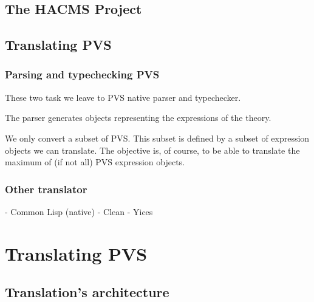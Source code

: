 \documentclass[12pt,a4paper]{article}
\begin{document}
\subsection{The HACMS Project}


\subsection{Translating PVS}
\subsubsection{Parsing and typechecking PVS}
These two task we leave to PVS native parser and typechecker.

The parser generates objects representing the expressions of the theory.

We only convert a subset of PVS.
This subset is defined by a subset of expression objects we can translate.
The objective is, of course, to be able to translate the maximum of (if not all) PVS expression objects.

\subsubsection{Other translator}
- Common Lisp (native)
- Clean
- Yices




\section{Translating PVS}

\subsection{Translation's architecture}
\end{document}
